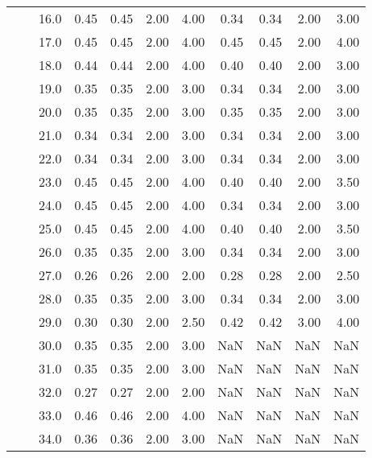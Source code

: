 \begin{tabular}{lllrrrrrrrr}
   &     & 16.0 &       0.45 &      0.45 & 2.00 &   4.00 &       0.34 &      0.34 & 2.00 &   3.00 \\
   &     & 17.0 &       0.45 &      0.45 & 2.00 &   4.00 &       0.45 &      0.45 & 2.00 &   4.00 \\
   &     & 18.0 &       0.44 &      0.44 & 2.00 &   4.00 &       0.40 &      0.40 & 2.00 &   3.00 \\
   &     & 19.0 &       0.35 &      0.35 & 2.00 &   3.00 &       0.34 &      0.34 & 2.00 &   3.00 \\
   &     & 20.0 &       0.35 &      0.35 & 2.00 &   3.00 &       0.35 &      0.35 & 2.00 &   3.00 \\
   &     & 21.0 &       0.34 &      0.34 & 2.00 &   3.00 &       0.34 &      0.34 & 2.00 &   3.00 \\
   &     & 22.0 &       0.34 &      0.34 & 2.00 &   3.00 &       0.34 &      0.34 & 2.00 &   3.00 \\
   &     & 23.0 &       0.45 &      0.45 & 2.00 &   4.00 &       0.40 &      0.40 & 2.00 &   3.50 \\
   &     & 24.0 &       0.45 &      0.45 & 2.00 &   4.00 &       0.34 &      0.34 & 2.00 &   3.00 \\
   &     & 25.0 &       0.45 &      0.45 & 2.00 &   4.00 &       0.40 &      0.40 & 2.00 &   3.50 \\
   &     & 26.0 &       0.35 &      0.35 & 2.00 &   3.00 &       0.34 &      0.34 & 2.00 &   3.00 \\
   &     & 27.0 &       0.26 &      0.26 & 2.00 &   2.00 &       0.28 &      0.28 & 2.00 &   2.50 \\
   &     & 28.0 &       0.35 &      0.35 & 2.00 &   3.00 &       0.34 &      0.34 & 2.00 &   3.00 \\
   &     & 29.0 &       0.30 &      0.30 & 2.00 &   2.50 &       0.42 &      0.42 & 3.00 &   4.00 \\
   &     & 30.0 &       0.35 &      0.35 & 2.00 &   3.00 &        NaN &       NaN &  NaN &    NaN \\
   &     & 31.0 &       0.35 &      0.35 & 2.00 &   3.00 &        NaN &       NaN &  NaN &    NaN \\
   &     & 32.0 &       0.27 &      0.27 & 2.00 &   2.00 &        NaN &       NaN &  NaN &    NaN \\
   &     & 33.0 &       0.46 &      0.46 & 2.00 &   4.00 &        NaN &       NaN &  NaN &    NaN \\
   &     & 34.0 &       0.36 &      0.36 & 2.00 &   3.00 &        NaN &       NaN &  NaN &    NaN \\

\end{tabular}
